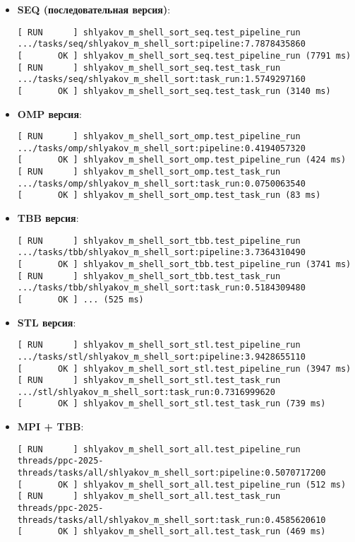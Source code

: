 \documentclass[a4paper,12pt]{article}
\begin{document}
\begin{itemize}
    \item \textbf{SEQ (последовательная версия)}: 
    \begin{verbatim}
[ RUN      ] shlyakov_m_shell_sort_seq.test_pipeline_run
.../tasks/seq/shlyakov_m_shell_sort:pipeline:7.7878435860
[       OK ] shlyakov_m_shell_sort_seq.test_pipeline_run (7791 ms)
[ RUN      ] shlyakov_m_shell_sort_seq.test_task_run
.../tasks/seq/shlyakov_m_shell_sort:task_run:1.5749297160
[       OK ] shlyakov_m_shell_sort_seq.test_task_run (3140 ms)
    \end{verbatim}

    \item \textbf{OMP версия}:
    \begin{verbatim}
[ RUN      ] shlyakov_m_shell_sort_omp.test_pipeline_run
.../tasks/omp/shlyakov_m_shell_sort:pipeline:0.4194057320
[       OK ] shlyakov_m_shell_sort_omp.test_pipeline_run (424 ms)
[ RUN      ] shlyakov_m_shell_sort_omp.test_task_run
.../tasks/omp/shlyakov_m_shell_sort:task_run:0.0750063540
[       OK ] shlyakov_m_shell_sort_omp.test_task_run (83 ms)

    \end{verbatim}

    \item \textbf{TBB версия}:
    \begin{verbatim}
[ RUN      ] shlyakov_m_shell_sort_tbb.test_pipeline_run
.../tasks/tbb/shlyakov_m_shell_sort:pipeline:3.7364310490
[       OK ] shlyakov_m_shell_sort_tbb.test_pipeline_run (3741 ms)
[ RUN      ] shlyakov_m_shell_sort_tbb.test_task_run
.../tasks/tbb/shlyakov_m_shell_sort:task_run:0.5184309480
[       OK ] ... (525 ms)
    \end{verbatim}

        \item \textbf{STL версия}:
    \begin{verbatim}
[ RUN      ] shlyakov_m_shell_sort_stl.test_pipeline_run
.../tasks/stl/shlyakov_m_shell_sort:pipeline:3.9428655110
[       OK ] shlyakov_m_shell_sort_stl.test_pipeline_run (3947 ms)
[ RUN      ] shlyakov_m_shell_sort_stl.test_task_run
.../stl/shlyakov_m_shell_sort:task_run:0.7316999620
[       OK ] shlyakov_m_shell_sort_stl.test_task_run (739 ms)
    \end{verbatim}

        \item \textbf{MPI + TBB}:
    \begin{verbatim}
[ RUN      ] shlyakov_m_shell_sort_all.test_pipeline_run
threads/ppc-2025-threads/tasks/all/shlyakov_m_shell_sort:pipeline:0.5070717200
[       OK ] shlyakov_m_shell_sort_all.test_pipeline_run (512 ms)
[ RUN      ] shlyakov_m_shell_sort_all.test_task_run
threads/ppc-2025-threads/tasks/all/shlyakov_m_shell_sort:task_run:0.4585620610
[       OK ] shlyakov_m_shell_sort_all.test_task_run (469 ms)
    \end{verbatim}
\end{itemize}
\end{document}
